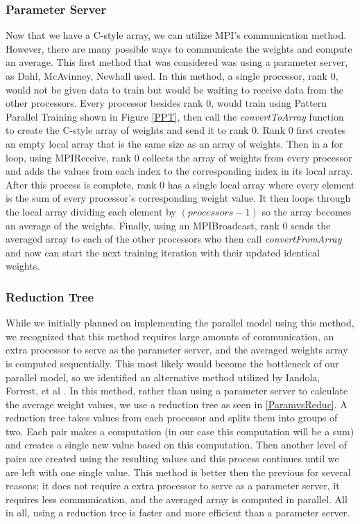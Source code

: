 \documentclass[11pt,twocolumn]{article}
\begin{document}
\subsubsection{Parameter Server}

Now that we have a C-style array, we can utilize MPI's communication method. However, there are many possible ways to communicate the weights and compute an average. This first method that was considered was using a parameter server, as Dahl, McAvinney, Newhall\cite{dahl:NNCluster} used. In this method, a single processor, rank 0, would not be given data to train but would be waiting to receive data from the other processors. Every processor besides rank 0, would train using Pattern Parallel Training shown in Figure \ref{PPT}, then call the \emph{convertToArray} function to create the C-style array of weights and send it to rank 0. Rank 0 first creates an empty local array that is the same size as an array of weights. Then in a for loop, using MPI\textunderscore Receive, rank 0 collects the array of weights from every processor and adds the values from each index to the corresponding index in its local array. After this process is complete, rank 0 has a single local array where every element is the sum of every processor's corresponding weight value. It then loops through the local array dividing each element by $(processors-1)$ so the array becomes an average of the weights. Finally, using an MPI\textunderscore Broadcast, rank 0 sends the averaged array to each of the other processors who then call \emph{convertFromArray} and now can start the next training iteration with their updated identical weights.

\subsubsection{Reduction Tree}
While we initially planned on implementing the parallel model using this method, we recognized that this method requires large amounts of communication, an extra processor to serve as the parameter server, and the averaged weights array is computed sequentially. This most likely would become the bottleneck of our parallel model, so we identified an alternative method utilized by Iandola, Forrest, et al \cite{iandola2016firecaffe}. In this method, rather than using a parameter server to calculate the average weight values, we use a reduction tree as seen in \ref{ParamvsReduc}. A reduction tree takes values from each processor and splits them into groups of two. Each pair makes a computation (in our case this computation will be a sum) and creates a single new value based on this computation. Then another level of pairs are created using the resulting values and this process continues until we are left with one single value. This method is better then the previous for several reasons; it does not require a extra processor to serve as a parameter server, it requires less communication, and the averaged array is computed in parallel. All in all, using a reduction tree is faster and more efficient than a parameter server.
\end{document}
